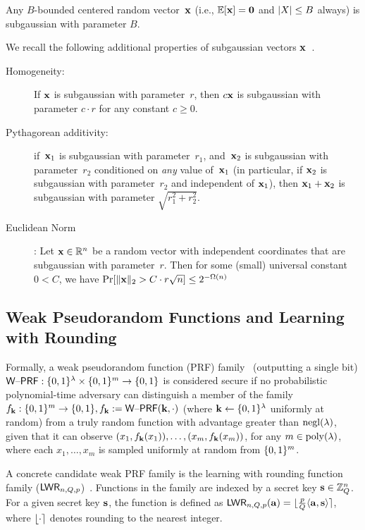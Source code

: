  Any
$B$-bounded centered random vector~$\mathbf{x}$ (i.e., $\operatorname*{\mathbb{E}}[\mathbf{x}]=\mathbf{0}$ and $\lvert X\rvert
\leq B$ always) is subgaussian with parameter $B$.

We recall the following additional properties of subgaussian vectors
$\mathbf{x}$~\cite{vershynin12:_compr_sensin_theor_applic}.
\begin{description}
\item[Homogeneity:] If $\mathbf{x}$ is subgaussian with
parameter~$r$, then $c\mathbf{x}$ is subgaussian with parameter $c \cdot r$ for
any constant $c \geq 0$.
\item[Pythagorean
  additivity:] if~$\mathbf{x}_{1}$ is subgaussian with parameter~$r_{1}$,
and~$\mathbf{x}_{2}$ is subgaussian with parameter~$r_{2}$ conditioned on
\emph{any} value of~$\mathbf{x}_{1}$ (in particular, if $\mathbf{x}_2$ is
subgaussian with parameter~$r_2$ and independent of $\mathbf{x}_{1}$), then $\mathbf{x}_{1} + \mathbf{x}_{2}$ is subgaussian with parameter
$\sqrt{r_{1}^{2} + r_{2}^{2}}$.
\item[Euclidean Norm]: 
  Let $\mathbf{x} \in \mathbb{R}^{n}$ be a random vector with independent
  coordinates that are subgaussian with parameter~$r$.  Then for some
  (small)   universal constant $0 < C$, we have $\Pr[\lVert\mathbf{x}\rVert_{2} > C
  \cdot r\sqrt{n}] \leq 2^{-\Omega(n)}$
\end{description}

\subsection{Weak Pseudorandom Functions and Learning with Rounding}
\label{sec:weak-pseud-funct}
Formally, a weak pseudorandom
function (PRF) family~\cite{DBLP:conf/crypto/DamgardN02} (outputting a single bit)
$\mathsf{W\text{\textendash}PRF}: \{0,1\}^{\lambda} \times \{0,1\}^{m} \to \{0,1\}$ is considered
secure if no probabilistic polynomial-time adversary can distinguish a
member of the family $f_{\mathbf{k}}:\{0,1\}^{m} \to \{0,1\}, f_{\mathbf{k}}:=\mathsf{W\text{\textendash}PRF}(\mathbf{k},\cdot)$ (where $\mathbf{k}
\gets \{0,1\}^{\lambda}$ uniformly at random) 
from a truly random function with advantage greater than
$\operatorname{negl}(\lambda)$, given that it can observe
$(x_1, f_{\mathbf{k}}(x_1)), \ldots, (x_m, f_{\mathbf{k}}(x_m))$, for any $m \in \operatorname{poly}(\lambda)$,
where each $x_1, \ldots, x_m$ is sampled uniformly at random from
$\{0,1\}^{m}$. 

A concrete candidate weak PRF family is the learning with
rounding function family
($\mathsf{LWR}_{n,Q,p}$)~\cite{DBLP:conf/eurocrypt/BanerjeePR12}.
Functions in the family are indexed by a secret key $\mathbf{s} \in
\mathbb{Z}_Q^n$. For a given secret key $\mathbf{s}$, the function  is defined as 
$\mathsf{LWR}_{n,Q,p}(\mathbf{a})=\lfloor\tfrac{p}{Q}\langle\mathbf{a},\mathbf{s}\rangle\rceil$, where $\lfloor\cdot\rceil$ denotes rounding to the nearest integer. 

